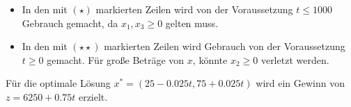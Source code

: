 \documentclass[a4paper]{scrartcl}
\begin{document}
\begin{enumerate}[label=\bfseries\arabic*.]
\begin{enumerate}
                \begin{itemize}
                    \item
                        In den mit $(\star)$ markierten Zeilen wird von der
                        Voraussetzung $t \leq 1000$ Gebrauch gemacht, da
                        $x_1, x_3 \geq 0$ gelten muss.
                    \item
                        In den mit $(\star\star)$ markierten Zeilen wird
                        Gebrauch von der Voraussetzung $t \geq 0$ gemacht.
                        Für große Beträge von $x$, könnte $x_2 \geq 0$ verletzt
                        werden.
                \end{itemize}

                Für die optimale Lösung $x^* = \left( 25 -0.025t, 75+0.025t \right)$
                wird ein Gewinn von $z = 6250 + 0.75t$ erzielt.

        \end{enumerate}

\end{enumerate}
\end{document}
